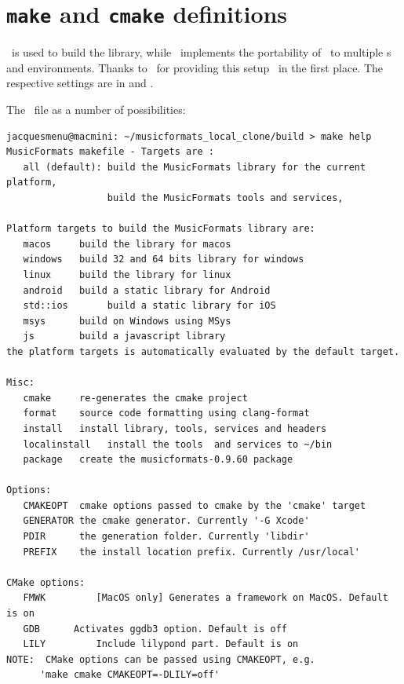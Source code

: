 \section{{\tt make} and {\tt cmake} definitions}

\make\ is used to build the library, while \cmake\ implements the portability of \mf\ to multiple \OS s and environments. Thanks to \fober\ for providing this setup \libmusicxml\ in the first place.
The respective settings are in  and .

The \make\ file as a number of possibilities:
\begin{lstlisting}[language=Terminal]
jacquesmenu@macmini: ~/musicformats_local_clone/build > make help
MusicFormats makefile - Targets are :
   all (default): build the MusicFormats library for the current platform,
                  build the MusicFormats tools and services,

Platform targets to build the MusicFormats library are:
   macos     build the library for macos
   windows   build 32 and 64 bits library for windows
   linux     build the library for linux
   android   build a static library for Android
   std::ios       build a static library for iOS
   msys      build on Windows using MSys
   js        build a javascript library
the platform targets is automatically evaluated by the default target.

Misc:
   cmake     re-generates the cmake project
   format    source code formatting using clang-format
   install   install library, tools, services and headers
   localinstall   install the tools  and services to ~/bin
   package   create the musicformats-0.9.60 package

Options:
   CMAKEOPT  cmake options passed to cmake by the 'cmake' target
   GENERATOR the cmake generator. Currently '-G Xcode'
   PDIR      the generation folder. Currently 'libdir'
   PREFIX    the install location prefix. Currently /usr/local'

CMake options:
   FMWK 		[MacOS only] Generates a framework on MacOS. Default is on
   GDB 		Activates ggdb3 option. Default is off
   LILY 		Include lilypond part. Default is on
NOTE:  CMake options can be passed using CMAKEOPT, e.g.
      'make cmake CMAKEOPT=-DLILY=off'
\end{lstlisting}


